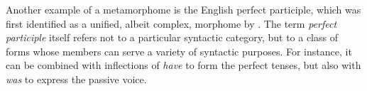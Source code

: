 \begin{table}[ht]
\centering %
\vspace{7pt}
\label{tab:l-morphome}
\caption{The stem \textit{crezc-} `say' is an L-morphome in Spanish.}
\end{table}

Another example of a metamorphome is the English perfect participle, which was first 
identified as a unified, albeit complex, morphome by \cite{aronoff:1994}. The term \emph{perfect participle} 
itself refers not to a particular syntactic category, but 
to a class of 
forms whose members 
can serve a variety of  syntactic purposes. For instance, it can be combined
with inflections of \emph{have} to form the perfect tenses, but also with 
\emph{was} to express the passive voice. 


